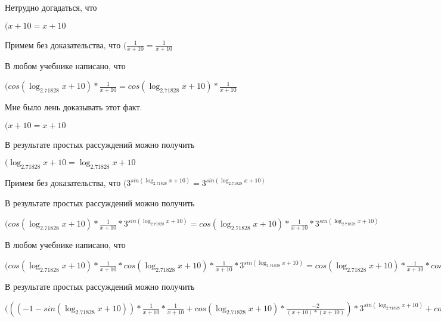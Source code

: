 \documentclass[12pt,a4paper,fleqn]{article}
\theoremstyle{definition}
\begin{document}
Нетрудно догадаться, что

$( x  +  10  =  x  +  10 $

Примем без доказательства, что
$(\frac{ 1 }{ x  +  10 }
 = \frac{ 1 }{ x  +  10 }
$

В любом учебнике написано, что

$(cos(\log_{ 2.71828 }{ x  +  10 }) * \frac{ 1 }{ x  +  10 }
 = cos(\log_{ 2.71828 }{ x  +  10 }) * \frac{ 1 }{ x  +  10 }
$

Мне было лень доказывать этот факт.

$( x  +  10  =  x  +  10 $

В результате простых рассуждений можно получить

$(\log_{ 2.71828 }{ x  +  10 } = \log_{ 2.71828 }{ x  +  10 }$

Примем без доказательства, что
$({ 3 }^{sin(\log_{ 2.71828 }{ x  +  10 })} = { 3 }^{sin(\log_{ 2.71828 }{ x  +  10 })}$

В результате простых рассуждений можно получить

$(cos(\log_{ 2.71828 }{ x  +  10 }) * \frac{ 1 }{ x  +  10 }
 * { 3 }^{sin(\log_{ 2.71828 }{ x  +  10 })} = cos(\log_{ 2.71828 }{ x  +  10 }) * \frac{ 1 }{ x  +  10 }
 * { 3 }^{sin(\log_{ 2.71828 }{ x  +  10 })}$

В любом учебнике написано, что

$(cos(\log_{ 2.71828 }{ x  +  10 }) * \frac{ 1 }{ x  +  10 }
 * cos(\log_{ 2.71828 }{ x  +  10 }) * \frac{ 1 }{ x  +  10 }
 * { 3 }^{sin(\log_{ 2.71828 }{ x  +  10 })} = cos(\log_{ 2.71828 }{ x  +  10 }) * \frac{ 1 }{ x  +  10 }
 * cos(\log_{ 2.71828 }{ x  +  10 }) * \frac{ 1 }{ x  +  10 }
 * { 3 }^{sin(\log_{ 2.71828 }{ x  +  10 })}$

В результате простых рассуждений можно получить

$((( -1  - sin(\log_{ 2.71828 }{ x  +  10 })) * \frac{ 1 }{ x  +  10 }
 * \frac{ 1 }{ x  +  10 }
 + cos(\log_{ 2.71828 }{ x  +  10 }) * \frac{ -2 }{( x  +  10 ) * ( x  +  10 )}
) * { 3 }^{sin(\log_{ 2.71828 }{ x  +  10 })} + cos(\log_{ 2.71828 }{ x  +  10 }) * \frac{ 1 }{ x  +  10 }
 * cos(\log_{ 2.71828 }{ x  +  10 }) * \frac{ 1 }{ x  +  10 }
 * { 3 }^{sin(\log_{ 2.71828 }{ x  +  10 })} = (( -1  - sin(\log_{ 2.71828 }{ x  +  10 })) * \frac{ 1 }{ x  +  10 }
 * \frac{ 1 }{ x  +  10 }
 + cos(\log_{ 2.71828 }{ x  +  10 }) * \frac{ -2 }{( x  +  10 ) * ( x  +  10 )}
) * { 3 }^{sin(\log_{ 2.71828 }{ x  +  10 })} + cos(\log_{ 2.71828 }{ x  +  10 }) * \frac{ 1 }{ x  +  10 }
 * cos(\log_{ 2.71828 }{ x  +  10 }) * \frac{ 1 }{ x  +  10 }
 * { 3 }^{sin(\log_{ 2.71828 }{ x  +  10 })}$
\end{document}
